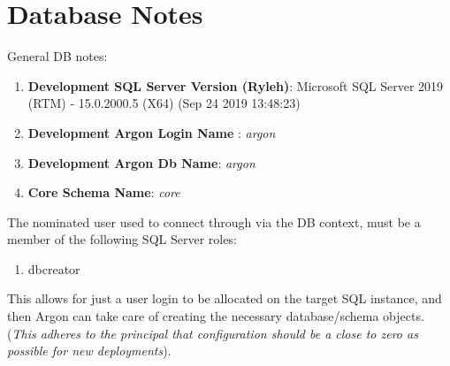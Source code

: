 \documentclass{book}
\begin{document}
\section{Database Notes}
General DB notes:
\begin{enumerate}
    \item \textbf{Development SQL Server Version (Ryleh)}: Microsoft SQL Server 2019 (RTM) - 15.0.2000.5 (X64) (Sep 24 2019 13:48:23)
    \item \textbf{Development Argon Login Name} : \textit{argon}
    \item \textbf{Development Argon Db Name}: \textit{argon}
    \item \textbf{Core Schema Name}: \textit{core} 
\end{enumerate}
The nominated user used to connect through via the DB context, must be a member of the following SQL Server roles:
\begin{enumerate}
    \item dbcreator
\end{enumerate}
This allows for just a user login to be allocated on the target SQL instance, and then Argon can take care of creating the necessary database/schema objects.  (\textit{This adheres to the principal that configuration should be a close to zero as possible for new deployments}).
\end{document}
